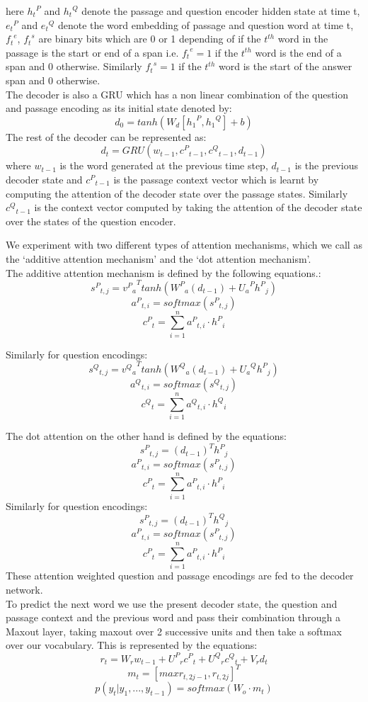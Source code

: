 here ${h_t}^P$ and ${h_t}^Q$ denote the passage and question encoder hidden state at time t, ${e_t}^P$ and ${e_t}^Q$ denote the word embedding of  passage and question word at time t, ${f_t}^e$, ${f_t}^s$ are binary bits which are 0 or 1 depending of if the $t^{th}$ word in the passage is the start or end of a span i.e.  ${f_t}^e = 1$ if the $t^{th}$ word is the end of a span and 0 otherwise. Similarly ${f_t}^s = 1$ if the $t^{th}$ word is the start of the answer span and 0 otherwise.\\
The decoder is also a GRU which has a non linear combination of the question and passage encoding as its initial state denoted by:
\[ d_0 = tanh(W_d[{h_1}^P, {h_1}^Q] + b) \]
The rest of the decoder can be represented as:
\[d_t = GRU(w_{t-1}, {c^P}_{t-1}, {c^Q}_{t-1}, d_{t-1})\]
where $w_{t−1}$ is the word generated at the previous time step, $d_{t−1}$ is the previous decoder state and ${c^P}_{t-1}$ is the passage context vector which is learnt by computing the attention of the decoder state over the passage states. Similarly ${c^Q}_{t-1}$ is the context vector computed by taking the attention of the decoder state over the states of the question encoder. 

We experiment with two different types of attention mechanisms, which we call as the `additive attention mechanism' and the `dot attention mechanism'. \\
The additive attention mechanism is defined by the following equations.:\\
\[  {{s^P}_{t,j}} = {{v^P}_a}^Ttanh({W^P}_a(d_{t-1}) + {U_a}^P{h^P}_j )\]
\[{a^P}_{t,i} = softmax({{s^P}_{t,j}})\]
\[{c^P}_t = \sum_{i=1}^n {a^P}_{t,i} \cdot {h^P}_i\]

Similarly for question encodings:\\
\[  {{s^Q}_{t,j}} = {{v^Q}_a}^Ttanh({W^Q}_a(d_{t-1}) + {U_a}^Q{h^P}_j )\]
\[{a^Q}_{t,i} = softmax({{s^Q}_{t,j}})\]
\[{c^Q}_t = \sum_{i=1}^n {a^Q}_{t,i} \cdot {h^Q}_i\]

The dot attention on the other hand is defined by the equations:\\
\[  {{s^P}_{t,j}} = (d_{t-1})^T{h^P}_j \]
\[{a^P}_{t,i} = softmax({{s^P}_{t,j}})\]
\[{c^P}_t = \sum_{i=1}^n {a^P}_{t,i} \cdot {h^P}_i\]
Similarly for question encodings:\\
\[  {{s^P}_{t,j}} = (d_{t-1})^T{h^Q}_j \]
\[{a^P}_{t,i} = softmax({{s^P}_{t,j}})\]
\[{c^P}_t = \sum_{i=1}^n {a^P}_{t,i} \cdot {h^P}_i\]
These attention weighted question and passage encodings are fed to the decoder network.\\
To predict the next word we use the present decoder state, the question and passage context and the previous word and pass their combination through a Maxout layer, taking maxout over 2 successive units and then take a softmax over our vocabulary. This is represented by the equations:\\
\[r_t = W_rw_{t-1} + {U^P}_r{c^P}_t + {U^Q}_r{c^Q}_t + V_rd_t \]
\[m_t = [max{r_{t,2j-1}, r_{t,2j}}]^T \]
\[p(y_t|y_1, . . . , y_{t-1}) = softmax(W_o \cdot m_t) \]


